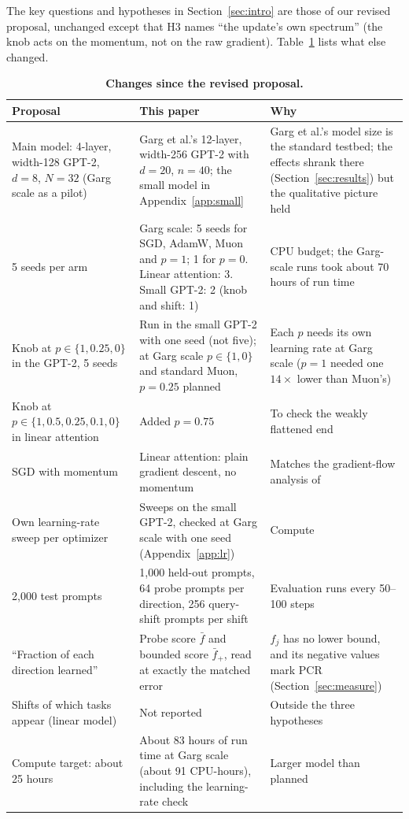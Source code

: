 The key questions and hypotheses in Section~\ref{sec:intro} are those of our revised proposal, unchanged except that H3 names ``the update's own spectrum'' (the knob acts on the momentum, not on the raw gradient). Table~\ref{tab:proposal} lists what else changed.

\begin{table}[h]
\caption{\textbf{Changes since the revised proposal.}}
\label{tab:proposal}
\vspace{2pt}
\centering\footnotesize
\begin{tabular}{@{}p{3.8cm}p{4.5cm}p{4.7cm}@{}}
\toprule
Proposal & This paper & Why \\
\midrule
Main model: 4-layer, width-128 GPT-2, $d = 8$, $N = 32$ (Garg scale as a pilot) & Garg et al.'s 12-layer, width-256 GPT-2 with $d = 20$, $n = 40$; the small model in Appendix~\ref{app:small} & Garg et al.'s model size is the standard testbed; the effects shrank there (Section~\ref{sec:results}) but the qualitative picture held \\
5 seeds per arm & Garg scale: 5 seeds for SGD, AdamW, Muon and $p=1$; 1 for $p=0$. Linear attention: 3. Small GPT-2: 2 (knob and shift: 1) & CPU budget; the Garg-scale runs took about 70 hours of run time \\
Knob at $p \in \{1, 0.25, 0\}$ in the GPT-2, 5 seeds & Run in the small GPT-2 with one seed (not five); at Garg scale $p \in \{1, 0\}$ and standard Muon, $p = 0.25$ planned & Each $p$ needs its own learning rate at Garg scale ($p=1$ needed one $14\times$ lower than Muon's) \\
Knob at $p \in \{1, 0.5, 0.25, 0.1, 0\}$ in linear attention & Added $p = 0.75$ & To check the weakly flattened end \\
SGD with momentum & Linear attention: plain gradient descent, no momentum & Matches the gradient-flow analysis of \citet{zhang2025training} \\
Own learning-rate sweep per optimizer & Sweeps on the small GPT-2, checked at Garg scale with one seed (Appendix~\ref{app:lr}) & Compute \\
2,000 test prompts & 1,000 held-out prompts, 64 probe prompts per direction, 256 query-shift prompts per shift & Evaluation runs every 50--100 steps \\
``Fraction of each direction learned'' & Probe score $\bar f$ and bounded score $\bar f_+$, read at exactly the matched error & $f_j$ has no lower bound, and its negative values mark PCR (Section~\ref{sec:measure}) \\
Shifts of which tasks appear (linear model) & Not reported & Outside the three hypotheses \\
Compute target: about 25 hours & About 83 hours of run time at Garg scale (about 91 CPU-hours), including the learning-rate check & Larger model than planned \\
\bottomrule
\end{tabular}
\end{table}

